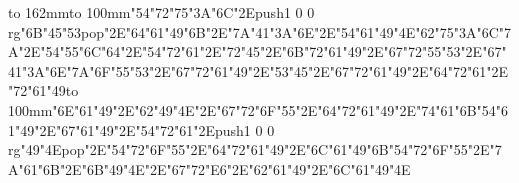 \hbox to 162mm{\hsize=69mm\vbox to 100mm{\vfill\ipa\char"54\ipa\char"72\ipa\char"75\ipa\char"3A\ipa\char"6C\ipa\char"2E\pdfcolorstack\match push{1 0 0 rg}\ipa\char"6B\ipa\char"45\ipa\char"53\pdfcolorstack\match pop{}\ipa\char"2E\ipa\char"64\ipa\char"61\ipa\char"49\ipa\char"6B\ipa\char"2E\ipa\char"7A\ipa\char"41\ipa\char"3A\ipa\char"6E\ipa\char"2E\ipa\char"54\ipa\char"61\ipa\char"49\ipa\char"4E\medskip\ipa\char"62\ipa\char"75\ipa\char"3A\ipa\char"6C\ipa\char"7A\ipa\char"2E\ipa\char"54\ipa\char"55\ipa\char"6C\ipa\char"64\ipa\char"2E\ipa\char"54\ipa\char"72\ipa\char"61\ipa\char"2E\ipa\char"72\ipa\char"45\ipa\char"2E\ipa\char"6B\ipa\char"72\ipa\char"61\ipa\char"49\ipa\char"2E\ipa\char"67\ipa\char"72\ipa\char"55\ipa\char"53\ipa\char"2E\ipa\char"67\ipa\char"41\ipa\char"3A\ipa\char"6E\medskip\ipa\char"7A\ipa\char"6F\ipa\char"55\ipa\char"53\ipa\char"2E\ipa\char"67\ipa\char"72\ipa\char"61\ipa\char"49\ipa\char"2E\ipa\char"53\ipa\char"45\ipa\char"2E\ipa\char"67\ipa\char"72\ipa\char"61\ipa\char"49\ipa\char"2E\ipa\char"64\ipa\char"72\ipa\char"61\ipa\char"2E\ipa\char"72\ipa\char"61\ipa\char"49\vfill}\hfill\vbox to 100mm{\vfill\ipa\char"6E\ipa\char"61\ipa\char"49\ipa\char"2E\ipa\char"62\ipa\char"49\ipa\char"4E\ipa\char"2E\ipa\char"67\ipa\char"72\ipa\char"6F\ipa\char"55\ipa\char"2E\ipa\char"64\ipa\char"72\ipa\char"61\ipa\char"49\ipa\char"2E\ipa\char"74\ipa\char"61\ipa\char"6B\medskip\ipa\char"54\ipa\char"61\ipa\char"49\ipa\char"2E\ipa\char"67\ipa\char"61\ipa\char"49\ipa\char"2E\ipa\char"54\ipa\char"72\ipa\char"61\ipa\char"2E\pdfcolorstack\match push{1 0 0 rg}\ipa\char"49\ipa\char"4E\pdfcolorstack\match pop{}\ipa\char"2E\ipa\char"54\ipa\char"72\ipa\char"6F\ipa\char"55\ipa\char"2E\ipa\char"64\ipa\char"72\ipa\char"61\ipa\char"49\ipa\char"2E\ipa\char"6C\ipa\char"61\ipa\char"49\ipa\char"6B\medskip\ipa\char"54\ipa\char"72\ipa\char"6F\ipa\char"55\ipa\char"2E\ipa\char"7A\ipa\char"61\ipa\char"6B\ipa\char"2E\ipa\char"6B\ipa\char"49\ipa\char"4E\ipa\char"2E\ipa\char"67\ipa\char"72\ipa\char"E6\ipa\char"2E\ipa\char"62\ipa\char"61\ipa\char"49\ipa\char"2E\ipa\char"6C\ipa\char"61\ipa\char"49\ipa\char"4E\vfill}}\eject
\bye